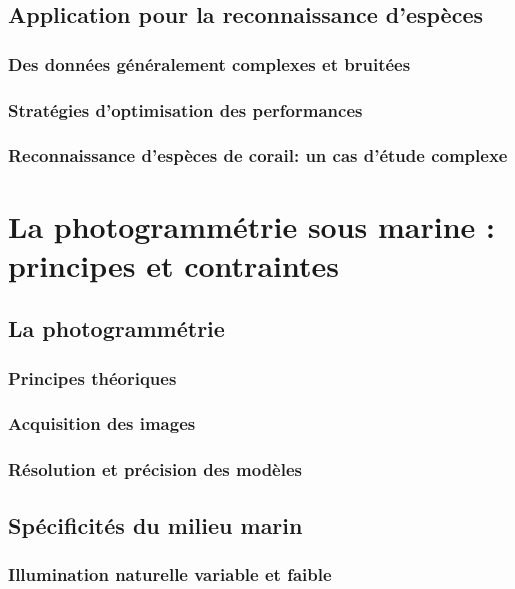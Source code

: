 \newpage

\subsection[Reconnaissance d'espèces]{Application pour la reconnaissance d'espèces}
\subsubsection{Des données généralement complexes et bruitées}
\subsubsection{Stratégies d'optimisation des performances}
\subsubsection{Reconnaissance d'espèces de corail: un cas d'étude complexe}

\newpage

\section[La photogrammétrie sous marine]{La photogrammétrie sous marine : principes et contraintes}\label{methodes.2}
\subsection{La photogrammétrie}
\subsubsection{Principes théoriques}
\subsubsection{Acquisition des images}
\subsubsection{Résolution et précision des modèles}

\newpage

\subsection{Spécificités du milieu marin}
\subsubsection{Illumination naturelle variable et faible}
